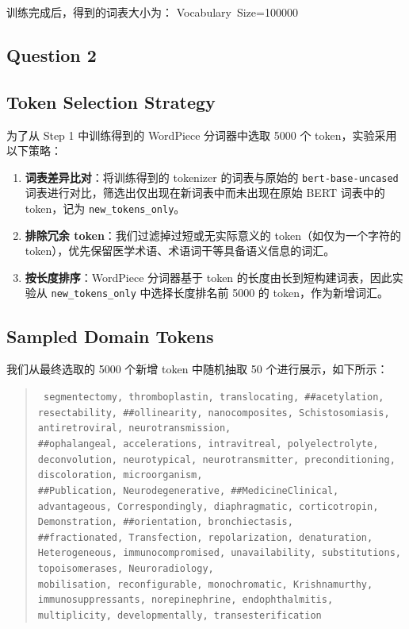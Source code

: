 \documentclass[12pt,letterpaper]{article}
\begin{document}
训练完成后，得到的词表大小为：
Vocabulary Size=100000

\subsection*{Question 2}

\subsection*{Token Selection Strategy}

为了从 Step 1 中训练得到的 WordPiece 分词器中选取 5000 个 token，实验采用以下策略：
\begin{enumerate}
	\item \textbf{词表差异比对}：将训练得到的 tokenizer 的词表与原始的 \texttt{bert-base-uncased} 词表进行对比，筛选出仅出现在新词表中而未出现在原始 BERT 词表中的 token，记为 \texttt{new\_tokens\_only}。
	\item \textbf{排除冗余 token}：我们过滤掉过短或无实际意义的 token（如仅为一个字符的 token），优先保留医学术语、术语词干等具备语义信息的词汇。
	\item \textbf{按长度排序}：WordPiece 分词器基于 token 的长度由长到短构建词表，因此实验从 \texttt{new\_tokens\_only} 中选择长度排名前 5000 的 token，作为新增词汇。
\end{enumerate}

\subsection*{Sampled Domain Tokens}

我们从最终选取的 5000 个新增 token 中随机抽取 50 个进行展示，如下所示：

\begin{quote}
	\small
	\texttt{
		segmentectomy, thromboplastin, translocating, \#\#acetylation, resectability, \#\#ollinearity, nanocomposites, Schistosomiasis, antiretroviral, neurotransmission,\\
		\#\#ophalangeal, accelerations, intravitreal, polyelectrolyte, deconvolution, neurotypical, neurotransmitter, preconditioning, discoloration, microorganism,\\
		\#\#Publication, Neurodegenerative, \#\#MedicineClinical, advantageous, Correspondingly, diaphragmatic, corticotropin, Demonstration, \#\#orientation, bronchiectasis,\\
		\#\#fractionated, Transfection, repolarization, denaturation, Heterogeneous, immunocompromised, unavailability, substitutions, topoisomerases, Neuroradiology,\\
		mobilisation, reconfigurable, monochromatic, Krishnamurthy, immunosuppressants, norepinephrine, endophthalmitis, multiplicity, developmentally, transesterification
	}
\end{quote}
\end{document}
